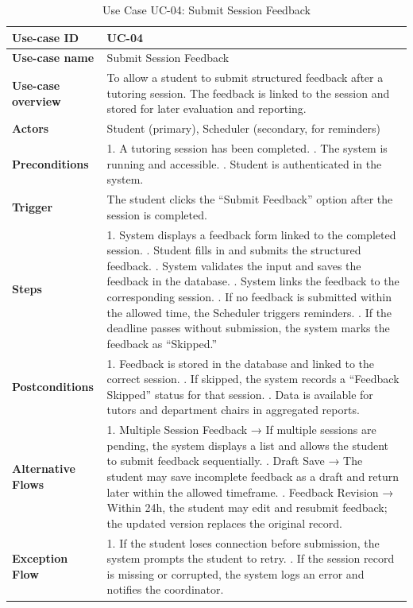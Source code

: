\begin{table}[h!]
\centering
\begin{tabular}{|p{3cm}|p{11cm}|}
\hline
\textbf{Use-case ID} & UC-04 \\
\hline
\textbf{Use-case name} & Submit Session Feedback \\
\hline
\textbf{Use-case overview} & To allow a student to submit structured feedback after a tutoring session. The feedback is linked to the session and stored for later evaluation and reporting. \\
\hline
\textbf{Actors} & Student (primary), Scheduler (secondary, for reminders) \\
\hline
\textbf{Preconditions} & 
1. A tutoring session has been completed. \newline
2. The system is running and accessible. \newline
3. Student is authenticated in the system. \\
\hline
\textbf{Trigger} & The student clicks the ``Submit Feedback'' option after the session is completed. \\
\hline
\textbf{Steps} & 
1. System displays a feedback form linked to the completed session. \newline
2. Student fills in and submits the structured feedback. \newline
3. System validates the input and saves the feedback in the database. \newline
4. System links the feedback to the corresponding session. \newline
5. If no feedback is submitted within the allowed time, the Scheduler triggers reminders. \newline
6. If the deadline passes without submission, the system marks the feedback as ``Skipped.'' \\
\hline
\textbf{Postconditions} & 
1. Feedback is stored in the database and linked to the correct session. \newline
2. If skipped, the system records a ``Feedback Skipped'' status for that session. \newline
3. Data is available for tutors and department chairs in aggregated reports. \\
\hline
\textbf{Alternative Flows} & 
1. Multiple Session Feedback → If multiple sessions are pending, the system displays a list and allows the student to submit feedback sequentially. \newline
2. Draft Save → The student may save incomplete feedback as a draft and return later within the allowed timeframe. \newline
3. Feedback Revision → Within 24h, the student may edit and resubmit feedback; the updated version replaces the original record. \\
\hline
\textbf{Exception Flow} & 
1. If the student loses connection before submission, the system prompts the student to retry. \newline
2. If the session record is missing or corrupted, the system logs an error and notifies the coordinator. \\
\hline
\end{tabular}
\caption{Use Case UC-04: Submit Session Feedback}
\end{table}
